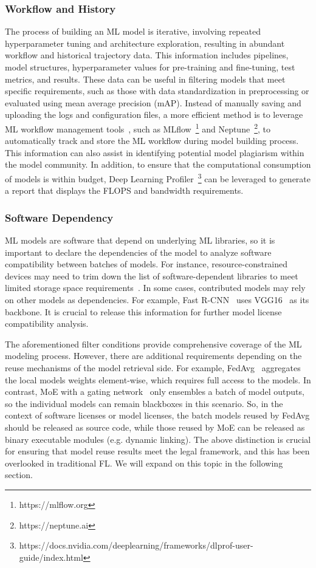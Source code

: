 \subsubsection{Workflow and History}
\label{sec:workflow&history}
The process of building an ML model is iterative, involving repeated hyperparameter tuning and architecture exploration, resulting in abundant workflow and historical trajectory data.
This information includes pipelines, model structures, hyperparameter values for pre-training and fine-tuning, test metrics, and results. 
These data can be useful in filtering models that meet specific requirements, such as those with data standardization in preprocessing or evaluated using mean average precision (mAP).
Instead of manually saving and uploading the logs and configuration files, a more efficient method is to leverage ML workflow management tools~\cite{vartak2016modeldb}, such as MLflow~\footnote{https://mlflow.org} and Neptune~\footnote{https://neptune.ai}, to automatically track and store the ML workflow during model building process. 
This information can also assist in identifying potential model plagiarism within the model community.
In addition, to ensure that the computational consumption of models is within budget, Deep Learning Profiler~\footnote{https://docs.nvidia.com/deeplearning/frameworks/dlprof-user-guide/index.html} can be leveraged to generate a report that displays the FLOPS and bandwidth requirements.

\subsubsection{Software Dependency}
ML models are software that depend on underlying ML libraries, so it is important to declare the dependencies of the model to analyze software compatibility between batches of models. 
For instance, resource-constrained devices may need to trim down the list of software-dependent libraries to meet limited storage space requirements~\cite{david2021tensorflow}.
In some cases, contributed models may rely on other models as dependencies. 
For example, Fast R-CNN~\cite{girshick2015fast} uses VGG16~\cite{simonyan2014very} as its backbone. 
It is crucial to release this information for further model license compatibility analysis.

The aforementioned filter conditions provide comprehensive coverage of the ML modeling process. 
However, there are additional requirements depending on the reuse mechanisms of the model retrieval side. 
For example, FedAvg~\cite{mcmahan2017communication} aggregates the local models weights element-wise, which requires full access to the models. 
In contrast, MoE with a gating network~\cite{jacobs1991adaptive} only ensembles a batch of model outputs, so the individual models can remain blackboxes in this scenario.
So, in the context of software licenses or model licenses, the batch models reused by FedAvg should be released as source code, while those reused by MoE can be released as binary executable modules (e.g. dynamic linking).
The above distinction is crucial for ensuring that model reuse results meet the legal framework, and this has been overlooked in traditional FL.
We will expand on this topic in the following section.


